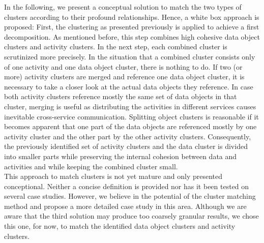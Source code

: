 In the following, we present a conceptual solution to match the two types of clusters according to their profound relationships. Hence, a white box approach is proposed: First, the clustering as presented previously is applied to achieve a first decomposition. As mentioned before, this step combines high cohesive data object clusters and activity clusters. In the next step, each combined cluster is scrutinized more precisely. In the situation that a combined cluster consists only of one activity and one data object cluster, there is nothing to do. If two (or more) activity clusters are merged and reference one data object cluster, it is necessary to take a closer look at the actual data objects they reference. In case both activity clusters reference mostly the same set of data objects in that cluster, merging is useful as distributing the activities in different services causes inevitable cross-service communication. Splitting object clusters is reasonable if it becomes apparent that one part of the data objects are referenced mostly by one activity cluster and the other part by the other activity clusters. Consequently, the previously identified set of activity clusters and the data cluster is divided into smaller parts while preserving the internal cohesion between data and activities and while keeping the combined cluster small. \\
This approach to match clusters is not yet mature and only presented conceptional. Neither a concise definition is provided nor has it been tested on several case studies. However, we believe in the potential of the cluster matching method and propose a more detailed case study in this area. Although we are aware that the third solution may produce too coarsely granular results, we chose this one, for now, to match the identified data object clusters and activity clusters. \\





